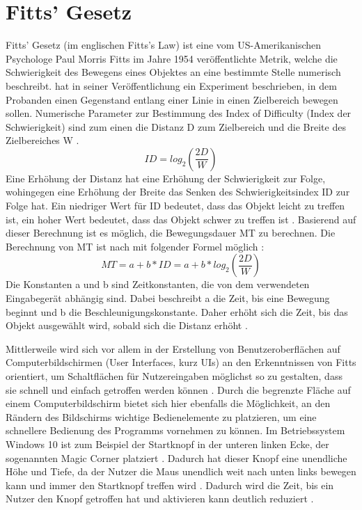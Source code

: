 \section{Fitts' Gesetz}
\label{section:FittsLaw}
Fitts' Gesetz (im englischen Fitts's Law) ist eine vom US-Amerikanischen Psychologe Paul Morris Fitts im Jahre 1954 veröffentlichte Metrik, welche die Schwierigkeit des Bewegens eines Objektes an eine bestimmte Stelle numerisch beschreibt. \citeauthor{Fitts.1992} hat in seiner Veröffentlichung ein Experiment beschrieben, in dem Probanden einen Gegenstand entlang einer Linie in einen Zielbereich bewegen sollen. Numerische Parameter zur Bestimmung des \glqq Index of Difficulty\grqq{} (Index der Schwierigkeit) sind zum einen die Distanz D zum Zielbereich und die Breite des Zielbereiches W \cite{Fitts.1992}.
\begin{equation}
ID = log_2 \left ( \frac{2D}{W} \right )
\end{equation}
Eine Erhöhung der Distanz hat eine Erhöhung der Schwierigkeit zur Folge, wohingegen eine Erhöhung der Breite das Senken des Schwierigkeitsindex ID zur Folge hat. Ein niedriger Wert für ID bedeutet, dass das Objekt leicht zu treffen ist, ein hoher Wert bedeutet, dass das Objekt schwer zu treffen ist \cite{Fitts.1992}. 
Basierend auf dieser Berechnung ist es möglich, die Bewegungsdauer \ac{MT} zu berechnen. Die Berechnung von \ac{MT} ist nach \citeauthor{Graham.1996} mit folgender Formel möglich \cite{Graham.1996}:
\begin{equation}
MT = a + b * ID = a + b * log_2 \left ( \frac{2D}{W} \right )
\end{equation}
Die Konstanten a und b sind Zeitkonstanten, die von dem verwendeten Eingabegerät abhängig sind. Dabei beschreibt a die Zeit, bis eine Bewegung beginnt und b die Beschleunigungskonstante. Daher erhöht sich die Zeit, bis das Objekt ausgewählt wird, sobald sich die Distanz erhöht \cite{Graham.1996}.

Mittlerweile wird sich vor allem in der Erstellung von Benutzeroberflächen auf Computerbildschirmen (User Interfaces, kurz UIs) an den Erkenntnissen von Fitts  orientiert, um Schaltflächen für Nutzereingaben möglichst so zu gestalten, dass sie schnell und einfach getroffen werden können \cite{Kexugit.2006}. Durch die begrenzte Fläche auf einem Computerbildschirm bietet sich hier ebenfalls die Möglichkeit, an den Rändern des Bildschirms wichtige Bedienelemente zu platzieren, um eine schnellere Bedienung des Programms vornehmen zu können. Im Betriebssystem Windows 10 ist zum Beispiel der Startknopf in der unteren linken Ecke, der sogenannten \glqq Magic Corner \grqq{} platziert \cite{Kexugit.2006}. Dadurch hat dieser Knopf eine \glqq unendliche\grqq{} Höhe und Tiefe, da der Nutzer die Maus unendlich weit nach unten links bewegen kann und immer den Startknopf treffen wird \cite{Kexugit.2006}. Dadurch wird die Zeit, bis ein Nutzer den Knopf getroffen hat und aktivieren kann deutlich reduziert \cite{Soukoreff.2004}.

